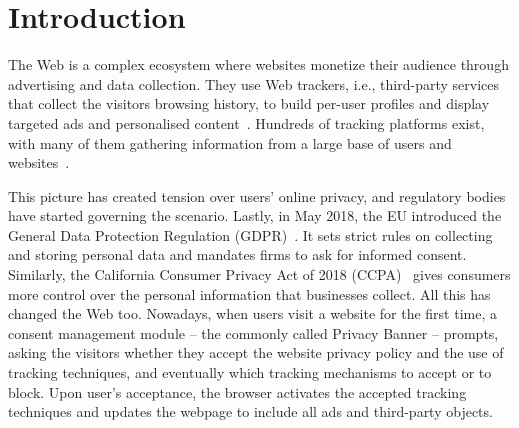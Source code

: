 \section{Introduction}
\label{sec:intro}

The Web is a complex ecosystem where websites monetize their audience through advertising and data collection. They use Web trackers, i.e., third-party services that collect the visitors browsing history, to build per-user profiles and display targeted ads and personalised content~\cite{acar2014web,rizzo2021unveiling,papadogiannakis2021user}.
Hundreds of tracking platforms exist, with many of them gathering information from a large base of users and websites~\cite{falahrastegar2014rise,metwalley2015online,pujol2015annoyed,iordanou2018tracing}.

This picture has created tension over users' online privacy, and regulatory bodies have started governing the scenario. 
Lastly, in May 2018, the EU introduced the General Data Protection Regulation (GDPR)~\cite{gpdr}. It sets strict rules on collecting and storing personal data and mandates firms to ask for informed consent. 
Similarly, the California Consumer Privacy Act of 2018 (CCPA)~\cite{ccpa} gives consumers more control over the personal information that businesses collect. All this has changed the Web too. Nowadays, when users visit a website for the first time, a consent management module -- the commonly called Privacy Banner -- prompts, asking the visitors whether they accept the website privacy policy and the use of tracking techniques, and eventually which tracking mechanisms to accept or to block. Upon user's acceptance, the browser activates the accepted tracking techniques and updates the webpage to include all ads and third-party objects.

